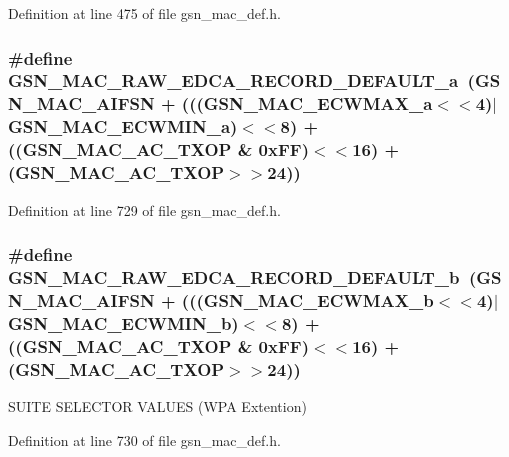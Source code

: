 Definition at line 475 of file gsn\_\-mac\_\-def.h.

\hypertarget{a00522_a498a49091ec42fa97c69fb7df3016f40}{
\subsubsection[{GSN\_\-MAC\_\-RAW\_\-EDCA\_\-RECORD\_\-DEFAULT\_\-a}]{\setlength{\rightskip}{0pt plus 5cm}\#define GSN\_\-MAC\_\-RAW\_\-EDCA\_\-RECORD\_\-DEFAULT\_\-a~(GSN\_\-MAC\_\-AIFSN + (((GSN\_\-MAC\_\-ECWMAX\_\-a$<$$<$4)$|$GSN\_\-MAC\_\-ECWMIN\_\-a)$<$$<$8) + ((GSN\_\-MAC\_\-AC\_\-TXOP \& 0xFF)$<$$<$16) + (GSN\_\-MAC\_\-AC\_\-TXOP$>$$>$24))}}
\label{a00522_a498a49091ec42fa97c69fb7df3016f40}


Definition at line 729 of file gsn\_\-mac\_\-def.h.

\hypertarget{a00522_ac71a60526676789c6e1b77ed47eb4a45}{
\subsubsection[{GSN\_\-MAC\_\-RAW\_\-EDCA\_\-RECORD\_\-DEFAULT\_\-b}]{\setlength{\rightskip}{0pt plus 5cm}\#define GSN\_\-MAC\_\-RAW\_\-EDCA\_\-RECORD\_\-DEFAULT\_\-b~(GSN\_\-MAC\_\-AIFSN + (((GSN\_\-MAC\_\-ECWMAX\_\-b$<$$<$4)$|$GSN\_\-MAC\_\-ECWMIN\_\-b)$<$$<$8) + ((GSN\_\-MAC\_\-AC\_\-TXOP \& 0xFF)$<$$<$16) + (GSN\_\-MAC\_\-AC\_\-TXOP$>$$>$24))}}
\label{a00522_ac71a60526676789c6e1b77ed47eb4a45}
SUITE SELECTOR VALUES (WPA Extention) 

Definition at line 730 of file gsn\_\-mac\_\-def.h.

